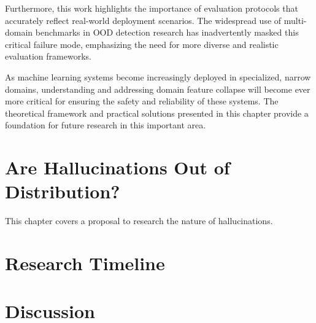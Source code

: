 \documentclass[11pt, oneside]{book}
\theoremstyle{plain}
\theoremstyle{definition}
\theoremstyle{remark}
\begin{document}
Furthermore, this work highlights the importance of evaluation protocols that accurately reflect real-world deployment scenarios. The widespread use of multi-domain benchmarks in OOD detection research has inadvertently masked this critical failure mode, emphasizing the need for more diverse and realistic evaluation frameworks.

As machine learning systems become increasingly deployed in specialized, narrow domains, understanding and addressing domain feature collapse will become ever more critical for ensuring the safety and reliability of these systems. The theoretical framework and practical solutions presented in this chapter provide a foundation for future research in this important area.


\chapter{Are Hallucinations Out of Distribution?}

This chapter covers a proposal to research the nature of hallucinations. 

\chapter{Research Timeline}




\chapter{Discussion}






\begin{appendices}

\end{appendices}
\end{document}
